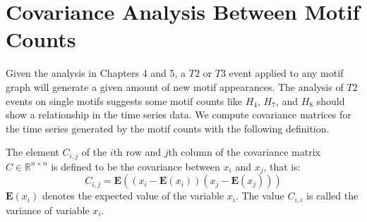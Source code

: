 


\chapter{Covariance Analysis Between Motif Counts}
Given the analysis in Chapters 4 and 5, a $T2$ or $T3$ event applied to any motif graph will generate a given amount of
new motif appearances. The analysis of $T2$ events on single motifs suggests some motif counts like $H_{4}$, $H_{7}$, and $H_{8}$ should show 
a relationship in the time series data. We
 compute covariance matrices for the time series generated by the motif counts with the following definition. 

 \vspace{1cm}

 \begin{definition}
    The element $C_{i,j}$ of the $i$th row and $j$th column of the covariance matrix $C \in \mathbb{R}^{n \times n}$
    is defined to be the covariance between $x_{i}$ and $x_j$, that is:
    $$
        C_{i,j} = \mathbf{E} ((x_i - \mathbf{E}(x_i))(x_j - \mathbf{E}(x_j)))
    $$
    $\mathbf{E}(x_i)$ denotes the expected value of the variable $x_i$. The value $C_{i,i}$ is called the variance of variable $x_i$.
    \label{def:cov}
\end{definition}

